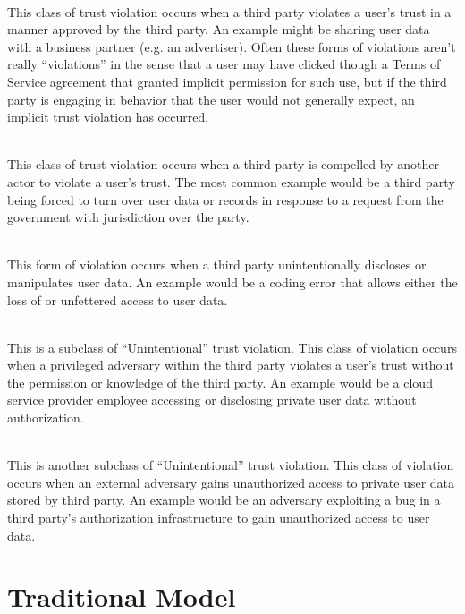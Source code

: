 \begin{packed_desc}
\item[Implicit (P):] \hfill \\
  This class of trust violation occurs when a third party violates a
  user's trust in a manner approved by the third party. An example
  might be sharing user data with a business partner (e.g. an
  advertiser). Often these forms of violations aren't really
  ``violations'' in the sense that a user may have clicked though a
  Terms of Service agreement that granted implicit permission for such
  use, but if the third party is engaging in behavior that the user
  would not generally expect, an implicit trust violation has
  occurred.
\item[Compelled (C):] \hfill \\
  This class of trust violation occurs when a third party is compelled
  by another actor to violate a user's trust. The most common example
  would be a third party being forced to turn over user data or
  records in response to a request from the government with
  jurisdiction over the party.
\item[Unintentional (U):] \hfill \\
  This form of violation occurs when a third party unintentionally
  discloses or manipulates user data. An example would be a coding
  error that allows either the loss of or unfettered access to user
  data.
\item[Insider (I):] \hfill \\
  This is a subclass of ``Unintentional'' trust violation. This class of
  violation occurs when a privileged adversary within the third party
  violates a user's trust without the permission or knowledge of the
  third party. An example would be a cloud service provider employee
  accessing or disclosing private user data without authorization.
\item[Outsider (O):] \hfill \\
  This is another subclass of ``Unintentional'' trust violation. This
  class of violation occurs when an external adversary gains
  unauthorized access to private user data stored by third party. An
  example would be an adversary exploiting a bug in a third party's
  authorization infrastructure to gain unauthorized access to user
  data.
\end{packed_desc}

\section{Traditional Model}
\label{chap:trust:traditional}

